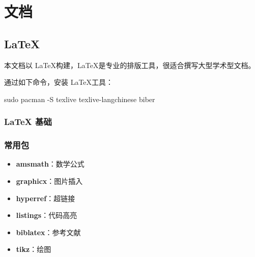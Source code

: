 \section{文档}

\subsection{\LaTeX}

本文档以 \LaTeX 构建，\LaTeX 是专业的排版工具，很适合撰写大型学术型文档。


通过如下命令，安装 \LaTeX 工具：

\begin{lstcode}[numbers=none]
  sudo pacman -S texlive texlive-langchinese biber
\end{lstcode}

\subsubsection{LaTeX 基础}



\subsubsection{常用包}

\begin{itemize}
  \item \textbf{amsmath}：数学公式
  \item \textbf{graphicx}：图片插入
  \item \textbf{hyperref}：超链接
  \item \textbf{listings}：代码高亮
  \item \textbf{biblatex}：参考文献
  \item \textbf{tikz}：绘图
\end{itemize}

